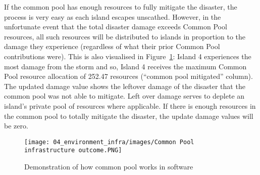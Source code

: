 If the common pool has enough resources to fully mitigate the disaster, the process is very easy as each island escapes unscathed. However, in the unfortunate event that the total disaster damage exceeds Common Pool resources, all such resources will be distributed to islands in proportion to the damage they experience (regardless of what their prior Common Pool contributions were). This is also visualised in Figure~\ref{fig:Common Pool infrastructure outcome}: Island 4 experiences the most damage from the storm and so, Island 4 receives the maximum Common Pool resource allocation of 252.47 resources (“common pool mitigated” column). The updated damage value shows the leftover damage of the disaster that the common pool was not able to mitigate. Left over damage serves to deplete an island's private pool of resources where applicable. If there is enough resources in the common pool to totally mitigate the disaster, the update damage values will be zero.

\begin{figure}[!htb]
    \centering
    \texttt{[image: 04\_environment\_infra/images/Common Pool infrastructure outcome.PNG]}
    \caption{Demonstration of how common pool works in software}
    \label{fig:Common Pool infrastructure outcome}
\end{figure}

